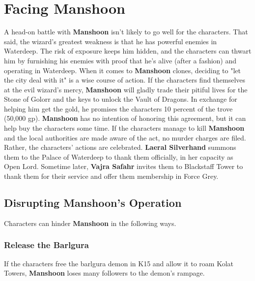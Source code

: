 \documentclass[10pt,a4paper,twoside,twocolumn,openany,nodeprecatedcode]{dndbook}
\begin{document}
\section{Facing Manshoon}
A head-on battle with \textbf{Manshoon} isn't likely to go well for the characters. That said, the wizard's greatest weakness is that he has powerful enemies in Waterdeep. The risk of exposure keeps him hidden, and the characters can thwart him by furnishing his enemies with proof that he's alive (after a fashion) and operating in Waterdeep. When it comes to \textbf{Manshoon} clones, deciding to "let the city deal with it" is a wise course of action.
If the characters find themselves at the evil wizard's mercy, \textbf{Manshoon} will gladly trade their pitiful lives for the Stone of Golorr and the keys to unlock the Vault of Dragons. In exchange for helping him get the gold, he promises the characters 10 percent of the trove (50,000 gp). \textbf{Manshoon} has no intention of honoring this agreement, but it can help buy the characters some time.
If the characters manage to kill \textbf{Manshoon} and the local authorities are made aware of the act, no murder charges are filed. Rather, the characters' actions are celebrated. \textbf{Laeral Silverhand} summons them to the Palace of Waterdeep to thank them officially, in her capacity as Open Lord. Sometime later, \textbf{Vajra Safahr} invites them to Blackstaff Tower to thank them for their service and offer them membership in Force Grey.
\subsection{Disrupting Manshoon's Operation}
Characters can hinder \textbf{Manshoon} in the following ways.
\subsubsection{Release the Barlgura}
If the characters free the barlgura demon in K15 and allow it to roam Kolat Towers, \textbf{Manshoon} loses many followers to the demon's rampage.
\end{document}
